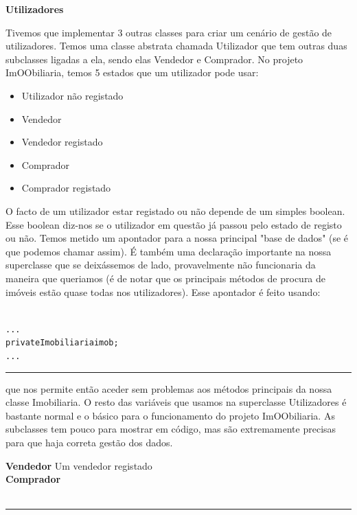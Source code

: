 \documentclass[12pt]{article}
\newenvironment{code}                    
{\textbf{
} \hspace{1cm} \hrulefill \\ 
\smallskip 
\begin{center}
\begin{minipage}{0.9\textwidth} 
\begin{alltt}\small}
{\end{alltt}
\end{minipage}
\end{center}
\hrule\smallskip
}
\begin{document}
\pagebreak

\textbf{Utilizadores}

Tivemos que implementar 3 outras classes para criar um cenário de gestão de utilizadores. 
\newline
Temos uma classe abstrata chamada Utilizador que tem outras duas subclasses ligadas a ela, sendo elas Vendedor e Comprador.
\newline
No projeto ImOObiliaria, temos 5 estados que um utilizador pode usar:

\begin{itemize}
\item Utilizador não registado
\item Vendedor
\item Vendedor registado
\item Comprador 
\item Comprador registado
\end{itemize}

O facto de um utilizador estar registado ou não depende de um simples boolean.\\ 
Esse boolean diz-nos se o utilizador em questão já passou pelo estado de registo ou não.
\newline
Temos metido um apontador para a nossa principal "base de dados" (se é que podemos chamar assim). 
É também uma declaração importante na nossa superclasse que se deixássemos de lado, provavelmente não funcionaria da maneira que queriamos (é de notar que os principais métodos de procura de imóveis estão quase todas nos utilizadores).
\newline
Esse apontador é feito usando:
~\\
\begin{code}
...
    private Imobiliaria imob;
...
\end{code}
que nos permite então aceder sem problemas aos métodos principais da nossa classe Imobiliaria.
\newline
O resto das variáveis que usamos na superclasse Utilizadores é bastante normal e o básico para o funcionamento do projeto ImOObiliaria.
\newline
As subclasses tem pouco para mostrar em código, mas são extremamente precisas para que haja correta gestão dos dados.
\pagebreak

\textbf{Vendedor}
Um vendedor registado  \\

\textbf{Comprador}
\\

\begin{code}

\end{code}
\end{document}
